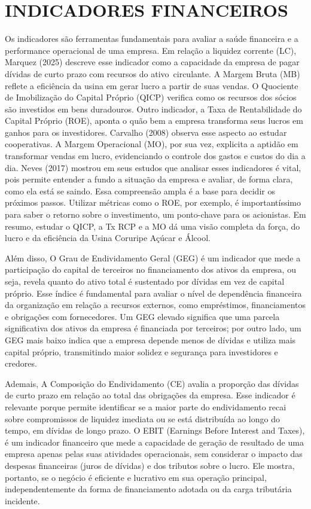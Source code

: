\documentclass[1pt,a4paper]{article}
\begin{document}
	\section{INDICADORES FINANCEIROS} 
	\setlength{\parindent}{1.5cm} 
	\hspace*{1.5cm} Os indicadores são ferramentas fundamentais para avaliar a saúde financeira e a performance operacional de uma empresa. Em relação a liquidez corrente (LC), Marquez (2025) descreve esse indicador como a capacidade da empresa de pagar dívidas de curto prazo com recursos do ativo circulante. A Margem Bruta (MB) reflete a eficiência da usina em gerar lucro a partir de suas vendas.  O Quociente de Imobilização do Capital Próprio (QICP) verifica como os recursos dos sócios são investidos em bens duradouros. Outro indicador, a Taxa de Rentabilidade do Capital Próprio (ROE), aponta o quão bem a empresa transforma seus lucros em ganhos para os investidores. Carvalho (2008) observa esse aspecto ao estudar cooperativas. A Margem Operacional (MO), por sua vez, explicita a aptidão em transformar vendas em lucro, evidenciando o controle dos gastos e custos do dia a dia. Neves (2017) mostrou em seus estudos que analisar esses indicadores é vital, pois permite entender a fundo a situação da empresa e avaliar, de forma clara, como ela está se saindo. Essa compreensão ampla é a base para decidir os próximos passos. Utilizar métricas como o ROE, por exemplo, é importantíssimo para saber o retorno sobre o investimento, um ponto-chave para os acionistas. Em resumo, estudar o QICP, a Tx RCP e a MO dá uma visão completa da força, do lucro e da eficiência da Usina Coruripe Açúcar e Álcool.
	
	Além disso, O Grau de Endividamento Geral (GEG) é um indicador que mede a participação do capital de terceiros no financiamento dos ativos da empresa, ou seja, revela quanto do ativo total é sustentado por dívidas em vez de capital próprio. Esse índice é fundamental para avaliar o nível de dependência financeira da organização em relação a recursos externos, como empréstimos, financiamentos e obrigações com fornecedores. Um GEG elevado significa que uma parcela significativa dos ativos da empresa é financiada por terceiros; por outro lado, um GEG mais baixo indica que a empresa depende menos de dívidas e utiliza mais capital próprio, transmitindo maior solidez e segurança para investidores e credores. 
	
	Ademais, A Composição do Endividamento (CE) avalia a proporção das dívidas de curto prazo em relação ao total das obrigações da empresa. Esse indicador é relevante porque permite identificar se a maior parte do endividamento recai sobre compromissos de liquidez imediata ou se está distribuída ao longo do tempo, em dívidas de longo prazo. O EBIT (Earnings Before Interest and Taxes), é um indicador financeiro que mede a capacidade de geração de resultado de uma empresa apenas pelas suas atividades operacionais, sem considerar o impacto das despesas financeiras (juros de dívidas) e dos tributos sobre o lucro. Ele mostra, portanto, se o negócio é eficiente e lucrativo em sua operação principal, independentemente da forma de financiamento adotada ou da carga tributária incidente. 
	
\end{document}
